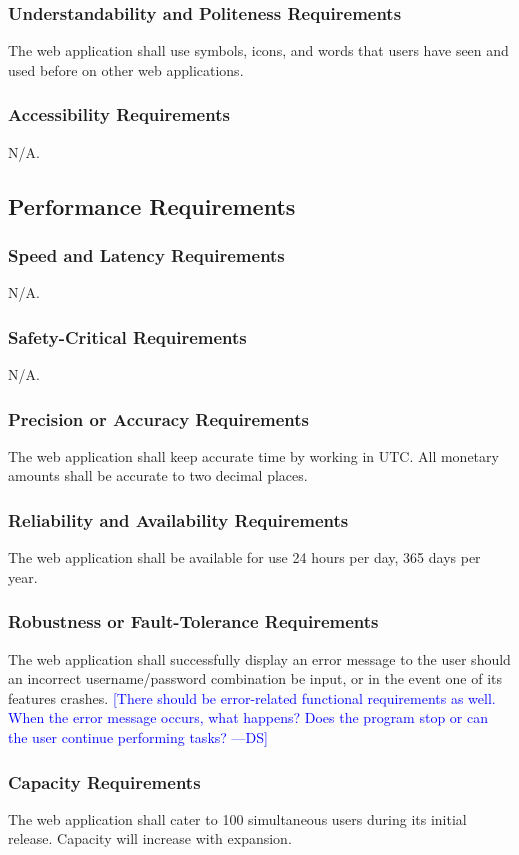 \documentclass[12pt]{article}
\newcommand{\authornote}[3]{\textcolor{#1}{[#3 ---#2]}}
\newcommand{\authornote}[3]{}
\newcommand{\ds}[1]{\authornote{blue}{DS}{#1}}
\begin{document}
{\subsubsection{Understandability and Politeness Requirements}
The web application shall use symbols, icons, and words that users have seen and used before on other web applications.
\subsubsection{Accessibility Requirements}
N/A.
\subsection{Performance Requirements}
\subsubsection{Speed and Latency Requirements}
N/A.
\subsubsection{Safety-Critical Requirements}
N/A.
\subsubsection{Precision or Accuracy Requirements}
The web application shall keep accurate time by working in UTC. All monetary 
amounts shall be accurate to two decimal places. 
\subsubsection{Reliability and Availability Requirements}
The web application shall be available for use 24 hours per day, 365 days per 
year.
\subsubsection{Robustness or Fault-Tolerance Requirements}
The web application shall successfully display an error message to the user 
should an incorrect username/password combination be input, or in the event one of its features crashes.  
\ds{There should be error-related functional requirements as well. When the
error message occurs, what happens? Does the program stop or can the user 
continue performing tasks?}
\subsubsection{Capacity Requirements}
The web application shall cater to 100 simultaneous users during its initial release. Capacity will increase with expansion.
}
\end{document}
